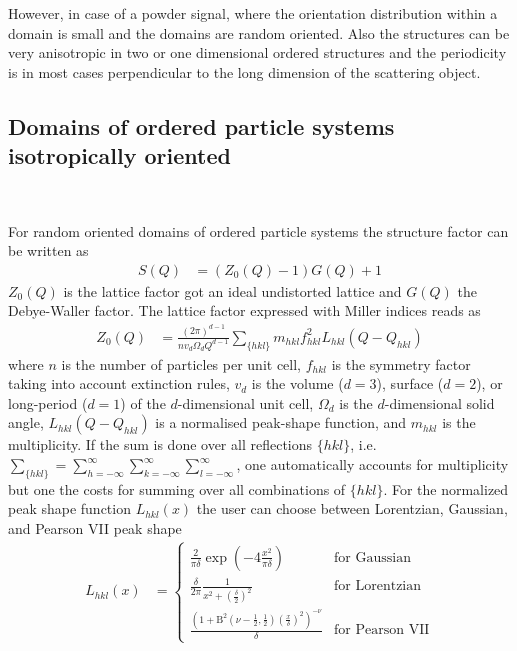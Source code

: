 However, in case of a powder signal, where the orientation distribution within a domain is small and the domains are random oriented. Also the structures can be very anisotropic in two or one dimensional ordered structures and the periodicity is in most cases perpendicular to the long dimension of the scattering object.

\subsection{Domains of ordered particle systems isotropically oriented}
\label{subsec:iso_ops}
~\newline

For random oriented domains of ordered particle systems the structure factor can be written as
\begin{align}
S(Q) &= \left(Z_0(Q)-1\right) G(Q) + 1
\end{align}
$Z_0(Q)$ is the lattice factor got an ideal undistorted lattice and $G(Q)$ the Debye-Waller factor. The lattice factor expressed with Miller indices reads as
\begin{align}
Z_0(Q) &= \frac{\left(2\pi\right)^{d-1}}{n v_d \Omega_d Q^{d-1}} \sum_{\{hkl\}} m_{hkl} f^2_{hkl} L_{hkl}(Q-Q_{hkl})
\end{align}
where $n$ is the number of particles per unit cell, $f_{hkl}$ is the symmetry factor taking into account extinction rules, $v_d$ is the volume ($d=3$), surface ($d=2$), or long-period ($d=1$) of the $d$-dimensional unit cell, $\Omega_d$ is the $d$-dimensional solid angle,  $L_{hkl}(Q-Q_{hkl})$ is a normalised peak-shape function, and $m_{hkl}$ is the multiplicity. If the sum is done over all reflections $\{hkl\}$, i.e. $\sum_{\{hkl\}}=\sum_{h=-\infty}^{\infty}\sum_{k=-\infty}^{\infty}\sum_{l=-\infty}^{\infty}$, one automatically accounts for multiplicity but one the costs for summing over all combinations of $\{hkl\}$. For the normalized peak shape function $L_{hkl}(x)$ the user can choose between Lorentzian, Gaussian, and Pearson VII peak shape
\begin{align}
L_{hkl}(x) &=
\begin{cases}
 \frac{2}{\pi\delta} \exp\left(-4\frac{x^2}{\pi\delta}\right)& \mbox{for Gaussian} \\
 \frac{\delta}{2\pi}\frac{1}{x^2+\left(\frac{\delta}{2}\right)^2}& \mbox{for Lorentzian} \\
 \frac{\left(1+\mathrm{B}^2\left(\nu-\frac12,\frac12\right)\left(\frac{x}{\delta}\right)^2\right)^{-\nu}}{\delta}& \mbox{for Pearson VII}
\end{cases}
\end{align}

